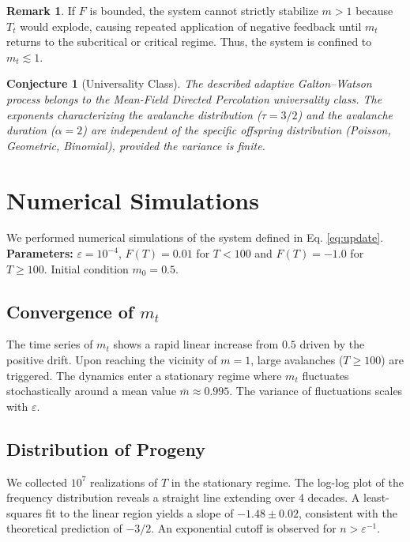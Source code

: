 \documentclass[11pt, a4paper]{article}
\newtheorem{conjecture}[theorem]{Conjecture}
\theoremstyle{definition}
\newtheorem{remark}[theorem]{Remark}
\begin{document}
\begin{remark}
If $F$ is bounded, the system cannot strictly stabilize $m > 1$ because $T_t$ would explode, causing repeated application of negative feedback until $m_t$ returns to the subcritical or critical regime. Thus, the system is confined to $m_t \lesssim 1$.
\end{remark}

\begin{conjecture}[Universality Class]
The described adaptive Galton--Watson process belongs to the Mean-Field Directed Percolation universality class. The exponents characterizing the avalanche distribution ($\tau = 3/2$) and the avalanche duration ($\alpha = 2$) are independent of the specific offspring distribution (Poisson, Geometric, Binomial), provided the variance is finite.
\end{conjecture}

\section{Numerical Simulations}

We performed numerical simulations of the system defined in Eq. \eqref{eq:update}.
\textbf{Parameters:} $\varepsilon = 10^{-4}$, $F(T) = 0.01$ for $T < 100$ and $F(T) = -1.0$ for $T \ge 100$. Initial condition $m_0 = 0.5$.

\subsection{Convergence of $m_t$}
The time series of $m_t$ shows a rapid linear increase from $0.5$ driven by the positive drift. Upon reaching the vicinity of $m=1$, large avalanches ($T \ge 100$) are triggered. The dynamics enter a stationary regime where $m_t$ fluctuates stochastically around a mean value $\bar{m} \approx 0.995$. The variance of fluctuations scales with $\varepsilon$.

\subsection{Distribution of Progeny}
We collected $10^7$ realizations of $T$ in the stationary regime. The log-log plot of the frequency distribution reveals a straight line extending over 4 decades. A least-squares fit to the linear region yields a slope of $-1.48 \pm 0.02$, consistent with the theoretical prediction of $-3/2$. An exponential cutoff is observed for $n > \varepsilon^{-1}$.
\end{document}
